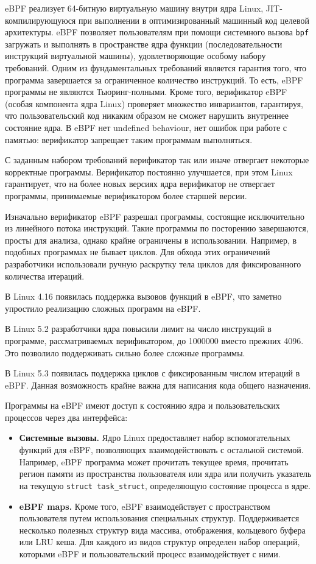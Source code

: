eBPF реализует 64-битную виртуальную машину внутри ядра Linux, JIT-компилирующуюся при выполнении в оптимизированный
машинный код целевой архитектуры. eBPF позволяет пользователям при помощи системного вызова \verb!bpf! загружать и выполнять в пространстве
ядра функции (последовательности инструкций виртуальной машины), удовлетворяющие особому набору требований.
Одним из фундаментальных требований является гарантия того, что программа завершается за ограниченное количество инструкций.
То есть, eBPF программы не являются Тьюринг-полными.
Кроме того, верификатор eBPF (особая компонента ядра Linux) проверяет множество инвариантов,
гарантируя, что пользовательский код никаким образом не сможет нарушить внутреннее состояние ядра.
В eBPF нет undefined behaviour, нет ошибок при работе с памятью: верификатор запрещает таким программам выполняться.

С заданным набором требований верификатор так или иначе отвергает некоторые корректные программы.
Верификатор постоянно улучшается, при этом Linux гарантирует, что на более новых версиях ядра верификатор не отвергает программы,
принимаемые верификатором более старшей версии.

Изначально верификатор eBPF разрешал программы, состоящие исключительно из линейного потока инструкций.
Такие программы по посторению завершаются, просты для анализа, однако крайне ограничены в использовании.
Например, в подобных программах не бывает циклов.
Для обхода этих ограничений разработчики использовали ручную раскрутку тела циклов для фиксированного количества итераций.

В Linux 4.16 появилась поддержка вызовов функций в eBPF, что заметно упростило реализацию сложных программ на eBPF.

В Linux 5.2 разработчики ядра повысили лимит на число инструкций в программе,
рассматриваемых верификатором, до 1000000 вместо прежних 4096.
Это позволило поддерживать сильно более сложные программы.

В Linux 5.3 появилась поддержка циклов с фиксированным числом итераций в eBPF.
Данная возможность крайне важна для написания кода общего назначения.

Программы на eBPF имеют доступ к состоянию ядра и пользовательских процессов через два интерфейса:
\begin{itemize}
    \item
        \textbf{Системные вызовы.}
        Ядро Linux предоставляет набор вспомогательных функций для eBPF,
        позволяющих взаимодействовать с остальной системой.
        Например, eBPF программа может прочитать текущее время, прочитать регион памяти из пространства пользователя или ядра
        или получить указатель на текущую \verb!struct task_struct!, определяющую состояние процесса в ядре.

    \item
        \textbf{eBPF maps.}
        Кроме того, eBPF взаимодействует с пространством пользователя путем использования специальных структур.
        Поддерживается несколько полезных структур вида массива, отображения, кольцевого буфера или LRU кеша.
        Для каждого из видов структур определен набор операций, которыми eBPF и пользовательский процесс взаимодействует с ними.
\end{itemize}

